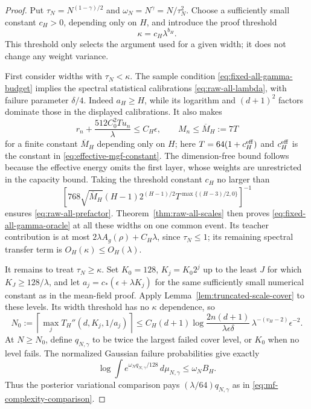 \begin{proof}
Put $\tau_N=N^{(1-\gamma)/2}$ and $\omega_N=N^\gamma=N/\tau_N^2$.
Choose a sufficiently small constant $c_H>0$, depending only on $H$,
and introduce the proof threshold
\[
 \kappa=c_H\lambda^{b_H}.
\]
This threshold only selects the argument used for a given width; it
does not change any weight variance.

First consider widths with $\tau_N<\kappa$.
The sample condition \eqref{eq:fixed-all-gamma-budget} implies the
spectral statistical calibrations \eqref{eq:raw-all-lambda}, with
failure parameter $\delta/4$.  Indeed $a_H\geq H$, while its logarithm
and $(d+1)^2$ factors dominate those in the displayed calibrations.
It also makes
\[
 r_n+\frac{512C_0^2Tu_n}{\lambda}\leq C_H\epsilon,
 \qquad M_n\leq\overline M_H:=7T
\]
for a finite constant $\overline M_H$ depending only on $H$;
here $T=64(1+c_H^{\rm eff})$ and $c_H^{\rm eff}$ is the constant
in \eqref{eq:effective-mgf-constant}.
The dimension-free bound follows because the effective energy omits
the first layer, whose weights are unrestricted in the capacity bound.
Taking the threshold constant $c_H$ no larger than
\[
 \left[768\sqrt{\overline M_H}(H-1)2^{(H-1)/2}
       T^{\max\{(H-3)/2,0\}}\right]^{-1}
\]
ensures \eqref{eq:raw-all-prefactor}.  Theorem~\ref{thm:raw-all-scales}
then proves \eqref{eq:fixed-all-gamma-oracle} at all these widths on
one common event.  Its teacher contribution is at most
$2\lambda A_g(\rho)+C_H\lambda$, since $\tau_N\leq1$;
its remaining spectral transfer term is $O_H(\kappa)\leq O_H(\lambda)$.

It remains to treat $\tau_N\geq\kappa$.  Set $K_0=128$,
$K_j=K_0 2^j$ up to the least $J$ for which $K_J\geq128/\lambda$,
and let $a_j=c_*(\epsilon+\lambda K_j)$ for the same sufficiently
small numerical constant as in the mean-field proof.
Apply Lemma~\ref{lem:truncated-scale-cover} to these levels.
Its width threshold has no $\kappa$ dependence, so
\begin{equation}
 N_0:=\left\lceil\max_j T_H''(d,K_j,1/a_j)\right\rceil
 \leq C_H(d+1)\log\!\frac{2n(d+1)}{\lambda\epsilon\delta}\,
                   \lambda^{-(v_H-2)}\epsilon^{-2}.
 \label{eq:fixed-all-gamma-width-threshold}
\end{equation}
At $N\geq N_0$, define $q_{N,\gamma}$ to be twice the largest failed
cover level, or $K_0$ when no level fails.  The normalized Gaussian
failure probabilities give exactly
\[
 \log\int e^{\omega_Nq_{N,\gamma}/128}\,d\mu_{N,\gamma}
       \leq\omega_N B_H.
\]
Thus the posterior variational comparison pays
$(\lambda/64)q_{N,\gamma}$ as in
\eqref{eq:mf-complexity-comparison}.


\end{proof}
